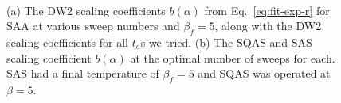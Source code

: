 \begin{figure}[t]
\begin{center}
\\
\caption{
(a) The DW2 scaling coefficients $b(\alpha)$ from Eq.~\eqref{eq:fit-exp-r} for SAA at various sweep numbers and $\beta_f=5$, along with the DW2 scaling coefficients for all $t_a$s we tried.
(b) The SQAS and SAS scaling coefficient $b(\alpha)$ at the optimal number of sweeps for each.  SAS had a final temperature of $\beta_f = 5$ and SQAS was operated at $\beta = 5$.}
\end{center}
\end{figure}


